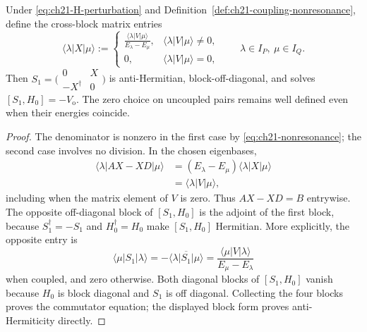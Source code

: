 \begin{theorem}
\label{thm:ch21-sw-generator}
Under \eqref{eq:ch21-H-perturbation} and
Definition~\ref{def:ch21-coupling-nonresonance}, define the
cross-block matrix entries
\begin{equation}
\langle\lambda\lvert X\rvert\mu\rangle:=
\begin{cases}
\displaystyle\frac{\langle\lambda\lvert V\rvert\mu\rangle}
 {E_\lambda-E_\mu}, &
       \langle\lambda\lvert V\rvert\mu\rangle\ne0,\\[6pt]
0,&\langle\lambda\lvert V\rvert\mu\rangle=0,
\end{cases}
\qquad \lambda\in I_P,\ \mu\in I_Q.
\label{eq:ch21-X-entries}
\end{equation}
Then $S_1=\bigl(\begin{smallmatrix}0&X\\-X^\dagger&0\end{smallmatrix}\bigr)$
is anti-Hermitian, block-off-diagonal, and solves
$[S_1,H_0]=-V_{\mathrm o}$.  The zero choice on uncoupled pairs remains
well defined even when their energies coincide.
\end{theorem}
\begin{proof}
The denominator is nonzero in the first case by
\eqref{eq:ch21-nonresonance}; the second case involves no division.
In the chosen eigenbases,
\begin{align*}
\langle\lambda\lvert AX-XD\rvert\mu\rangle
 &=(E_\lambda-E_\mu)
     \langle\lambda\lvert X\rvert\mu\rangle\\
 &=\langle\lambda\lvert V\rvert\mu\rangle,
\end{align*}
including when the matrix element of $V$ is zero.  Thus $AX-XD=B$
entrywise.  The opposite off-diagonal block of
$[S_1,H_0]$ is the adjoint of the first block, because
$S_1^\dagger=-S_1$ and $H_0^\dagger=H_0$ make $[S_1,H_0]$ Hermitian.
More explicitly, the opposite entry is
\begin{equation*}
 \langle\mu\lvert S_1\rvert\lambda\rangle
 =-\overline{\langle\lambda\lvert S_1\rvert\mu\rangle}
 =\frac{\langle\mu\lvert V\rvert\lambda\rangle}{E_\mu-E_\lambda}
\end{equation*}
when coupled, and zero otherwise.  Both diagonal blocks of
$[S_1,H_0]$ vanish because $H_0$ is block diagonal and $S_1$ is
off diagonal.  Collecting the four blocks proves the commutator
equation; the displayed block form proves anti-Hermiticity directly.
\end{proof}

